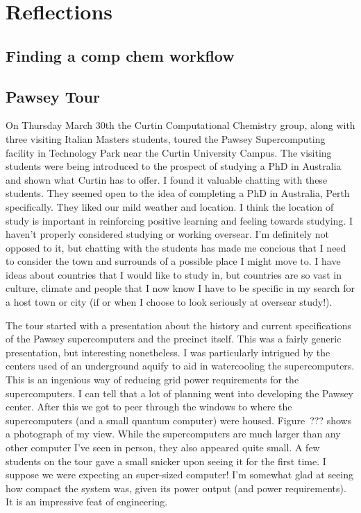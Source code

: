 \documentclass[11pt]{article}
\begin{document}
\section{Reflections}

\subsection{Finding a comp chem workflow}
\subsection{Pawsey Tour}

On Thursday March 30th the Curtin Computational Chemistry group, along with three visiting Italian Masters students, toured the Pawsey Supercomputing facility in Technology Park near the Curtin University Campus. The visiting students were being introduced to the prospect of studying a PhD in Australia and shown what Curtin has to offer. I found it valuable chatting with these students. They seemed open to the idea of completing a PhD in Australia, Perth specifically. They liked our mild weather and location. I think the location of study is important in reinforcing positive learning and feeling towards studying. I haven't properly considered studying or working oversear. I'm definitely not opposed to it, but chatting with the students has made me concious that I need to consider the town and surrounds of a possible place I might move to. I have ideas about countries that I would like to study in, but countries are so vast in culture, climate and people that I now know I have to be specific in my search for a host town or city (if or when I choose to look seriously at oversear study!).

The tour started with a presentation about the history and current specifications of the Pawsey supercomputers and the precinct itself. This was a fairly generic presentation, but interesting nonetheless. I was particularly intrigued by the centers used of an underground aquify to aid in watercooling the supercomputers. This is an ingenious way of reducing grid power requirements for the supercomputers. I can tell that a lot of planning went into developing the Pawsey center. After this we got to peer through the windows to where the supercomputers (and a small quantum computer) were housed. Figure~??? shows a photograph of my view. While the supercomputers are much larger than any other computer I've seen in person, they also appeared quite small. A few students on the tour gave a small snicker upon seeing it for the first time. I suppose we were expecting an super-sized computer! I'm somewhat glad at seeing how compact the system was, given its power output (and power requirements). It is an impressive feat of engineering.
\end{document}
